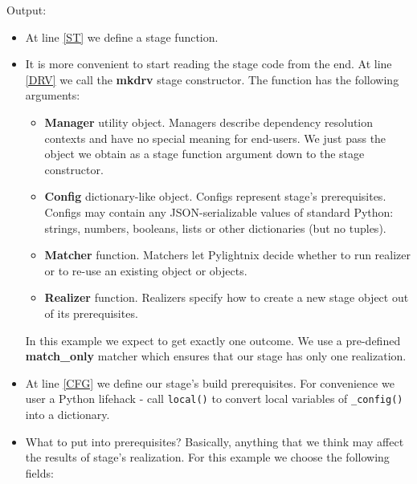 Output:

\mysmallstdout

\begin{itemize}
  \item At line \ref{ST} we define a stage function.

  \item It is more convenient to start reading the stage code from the end.  At
    line \ref{DRV} we call the \textbf{mkdrv} stage constructor. The function
    has the following arguments:

    \begin{itemize}

      \item \textbf{Manager} utility object. Managers describe dependency
        resolution contexts and have no special meaning for end-users. We just
        pass the object we obtain as a stage function argument down to the stage
        constructor.

      \item \textbf{Config} dictionary-like object. Configs represent stage's
        prerequisites. Configs may contain any JSON-serializable values of
        standard Python: strings, numbers, booleans, lists or other dictionaries
        (but no tuples).

      \item \textbf{Matcher} function. Matchers let Pylightnix decide whether to
        run realizer or to re-use an existing object or objects.

      \item \textbf{Realizer} function. Realizers specify how to create a new
        stage object out of its prerequisites.

    \end{itemize}

    In this example we expect to get exactly one outcome. We use a pre-defined
    \textbf{match\_only} matcher which ensures that our stage has only one
    realization.

  \item At line \ref{CFG} we define our stage's build prerequisites. For
    convenience we user a Python lifehack - call \texttt{local()} to convert
    local variables of \texttt{\_config()} into a dictionary.

  \item What to put into prerequisites? Basically, anything that we think may
    affect the results of stage's realization. For this example we choose the
    following fields:


\end{itemize}
